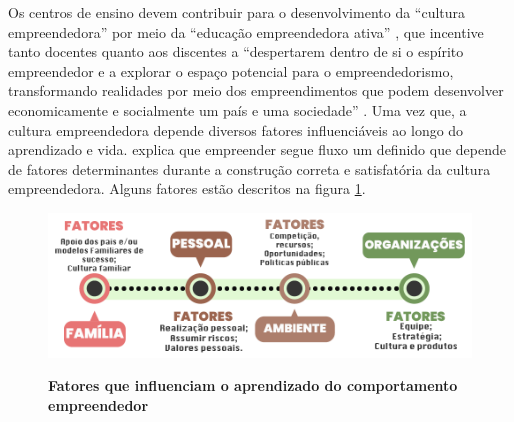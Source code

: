 




Os centros de ensino devem contribuir para o desenvolvimento da “cultura empreendedora” por meio da “educação empreendedora ativa” \cite{tscha_empreendendo_2014}, que incentive tanto docentes quanto aos discentes a “despertarem dentro de si o espírito empreendedor e a explorar o espaço potencial para o empreendedorismo, transformando realidades por meio dos empreendimentos que podem desenvolver economicamente e socialmente um país e uma sociedade” \cite{tscha_empreendendo_2014}. Uma vez que, a cultura empreendedora depende diversos fatores influenciáveis ao longo do aprendizado e vida. \cite{dornelas_empreendedorismo_2005} explica que empreender segue fluxo um definido que depende de fatores determinantes durante a construção correta e satisfatória da cultura empreendedora. Alguns fatores estão descritos na figura \ref{figura_2}.

\begin{figure}[H]
\centering
\caption{\textbf{Fatores que influenciam o aprendizado do comportamento empreendedor}}
\includegraphics[scale=0.8]{Imagens/esquema_influencias_empreendedorismo.png}
\label{figura_2}
\end{figure}


